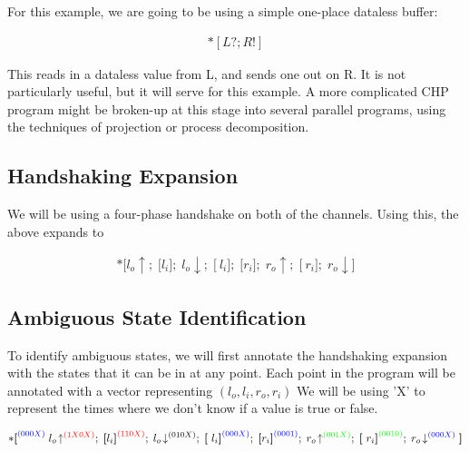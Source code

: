 \documentclass[times,10pt]{article}
\begin{document}
For this example, we are going to be using a simple one-place dataless buffer:

\begin{align*}
*[L?;R!]
\end{align*}

This reads in a dataless value from L, and sends one out on R.  It is not particularly useful, but it will serve for this example.  A more complicated CHP program might be broken-up at this stage into several parallel programs, using the techniques of projection or process decomposition. 

\subsection{Handshaking Expansion}

We will be using a four-phase handshake on both of the channels.  Using this, the above expands to


\begin{align*} 
*\textbf{[}l_o \! \uparrow; \; \textbf{[}l_i\textbf{]}; \; l_o\!\downarrow; \; \textbf{[}~l_i\textbf{]}; \; \textbf{[}r_i\textbf{]}; \; r_o \! \uparrow; \; \textbf{[}~r_i\textbf{]}; \; r_o \! \downarrow\textbf{]}
\end{align*}


\subsection{Ambiguous State Identification}

To identify ambiguous states, we will first annotate the handshaking expansion with the states that it can be in at any point.  Each point in the program will be annotated with a vector representing $(l_o, l_i, r_o, r_i)$ We will be using 'X' to represent the times where we don't know if a value is true or false.


\begin{align*} 
*\textbf{[} ^{\color{blue}(000X)} \;  l_o \! \uparrow^{\color{red}(1X0X)}; \; \textbf{[}l_i\textbf{]}^{\color{red}(110X)}; \; l_o\!\downarrow^{(010X)}; \; \textbf{[}~l_i\textbf{]}^{\color{blue}(000X)}; \; \textbf{[}r_i\textbf{]}^{\color{blue}(0001)}; \; r_o \! \uparrow^{\color{green}(001X)}; \; \textbf{[}~r_i\textbf{]}^{\color{green}(0010)}; \; r_o \! \downarrow^{\color{blue}(000X)}\textbf{]}
\end{align*}
\end{document}
